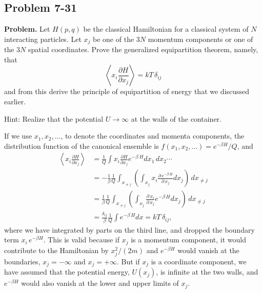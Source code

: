 \documentclass[twocolumn, 10pt]{article}
\numberwithin{equation}{section}
\newenvironment{problem}
{\par\medskip \color{problue}
  \textbf{Problem. }\ignorespaces}
{\medskip}
\newenvironment{solution}[1][\empty]
{\par\medskip\sffamily
  \textbf{\ifx\empty#1{Solution.}\relax\else{#1}\fi} \ignorespaces}
{\medskip}
\begin{document}
\subsection{Problem 7-31}

\begin{problem}
  Let $H(p, q)$ be the classical Hamiltonian
  for a classical system of $N$ interacting particles.
  Let $x_j$ be one of the $3N$ momentum components
  or one of the $3N$ spatial coordinates.
  Prove the generalized equipartition theorem, namely, that
  $$
  \left\langle
    x_i \frac{ \partial H } { \partial x_j }
  \right\rangle
  = kT \, \delta_{ij}
  $$
  and from this derive the principle
  of equipartition of energy that we discussed earlier.

  Hint: Realize that the potential $U \to \infty$
  at the walls of the container.
\end{problem}

\begin{solution}
If we use $x_1, x_2, \dots$, to denote
the coordinates and momenta components,
the distribution function of the canonical ensemble
is $f(x_1, x_2, \dots) = e^{-\beta H}/Q$, and
%
\begin{align*}
  \left\langle
    x_i \frac{ \partial H } { \partial x_j }
  \right\rangle
  &=
  \frac{1}{Q} \int
    x_i \frac{ \partial H } { \partial x_j }
    e^{-\beta \, H}
    d x_1 \, d x_2 \cdots
  \\
  &=
  -
  \frac{1}{\beta}
  \frac{1}{Q}
  \int_{x_{\ne j}}
    \left(
      \int_{x_j}
      x_i \frac{ \partial \, e^{-\beta \, H} } { \partial \, x_j }
      d x_j
    \right) \, d x_{\ne j}
  \\
  &=
  \frac{1}{\beta}
  \frac{1}{Q}
  \int_{x_{\ne j}}
    \left(
      \int_{x_j}
      \frac{ \partial \, x_i } { \partial \, x_j }
      e^{-\beta \, H}
      d x_j
    \right)
  \, d x_{\ne j}
  \\
  &=
  \frac{\delta_{ij}}{\beta}
  \frac{1}{Q}
  \int e^{-\beta \, H} d x
  = kT \, \delta_{ij}
  ,
\end{align*}
%
where we have integrated by parts on the third line,
and dropped the boundary term $x_i \, e^{-\beta H}$.
This is valid because if $x_j$ is a momentum component,
it would contribute to the Hamiltonian by $x_j^2/(2m)$
and $e^{-\beta H}$ would vanish at the boundaries,
$x_j = -\infty$ and $x_j = +\infty$.
%
But if $x_j$ is a coordinate component,
we have assumed that the potential energy, $U(x_j)$,
is infinite at the two walls,
and $e^{-\beta H}$ would also vanish
at the lower and upper limits of $x_j$.
\end{solution}
\end{document}
